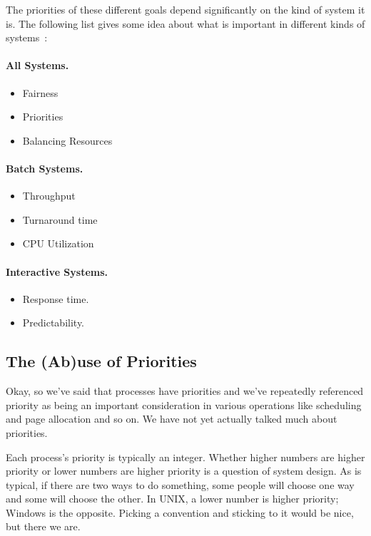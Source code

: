 The priorities of these different goals depend significantly on the kind of system it is. The following list gives some idea about what is important in different kinds of systems~\cite{mos}:

\paragraph{All Systems.}
\begin{itemize}
	\item Fairness
	\item Priorities
	\item Balancing Resources
\end{itemize}

\paragraph{Batch Systems.}
\begin{itemize}
	\item Throughput
	\item Turnaround time
	\item CPU Utilization
\end{itemize}

\paragraph{Interactive Systems.}
\begin{itemize}
	\item Response time.
	\item Predictability.
\end{itemize}

\subsection*{The (Ab)use of Priorities}

Okay, so we've said that processes have priorities and we've repeatedly referenced priority as being an important consideration in various operations like scheduling and page allocation and so on. We have not yet actually talked much about priorities.

Each process's priority is typically an integer. Whether higher numbers are higher priority or lower numbers are higher priority is a question of system design. As is typical, if there are two ways to do something, some people will choose one way and some will choose the other. In UNIX, a lower number is higher priority; Windows is the opposite. Picking a convention and sticking to it would be nice, but there we are.

